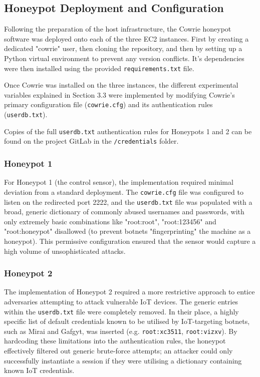\documentclass[]{article}
\begin{document}
\subsection{Honeypot Deployment and Configuration}

Following the preparation of the host infrastructure, the Cowrie honeypot software was deployed onto each of the three EC2 instances. First by creating a dedicated "cowrie" user, then cloning the repository, and then by setting up a Python virtual environment to prevent any version conflicts. It's dependencies were then installed using the provided \texttt{requirements.txt} file.

Once Cowrie was installed on the three instances, the different experimental variables explained in Section 3.3 were implemented by modifying Cowrie's primary configuration file (\texttt{cowrie.cfg}) and its authentication rules (\texttt{userdb.txt}).

Copies of the full \texttt{userdb.txt} authentication rules for Honeypots 1 and 2 can be found on the project GitLab in the \texttt{/credentials} folder.

\subsubsection{Honeypot 1}

For Honeypot 1 (the control sensor), the implementation required minimal deviation from  a standard deployment. The \texttt{cowrie.cfg} file was configured to listen on the redirected port 2222, and the \texttt{userdb.txt} file was populated with a broad, generic dictionary of commonly abused usernames and passwords, with only extremely basic combinations like "root:root", "root:123456" and "root:honeypot" disallowed (to prevent botnets "fingerprinting" the machine as a honeypot). This permissive configuration ensured that the sensor would capture a high volume of unsophisticated attacks.

\subsubsection{Honeypot 2}

The implementation of Honeypot 2 required a more restrictive approach to entice adversaries attempting to attack vulnerable IoT devices. The generic entries within the \texttt{userdb.txt} file were completely removed. In their place, a highly specific list of default credentials known to be utilised by IoT-targeting botnets, such as Mirai and Gafgyt, was inserted (e.g. \texttt{root:xc3511}, \texttt{root:vizxv}). By hardcoding these limitations into the authentication rules, the honeypot effectively filtered out generic brute-force attempts; an attacker could only successfully instantiate a session if they were utilising a dictionary containing known IoT credentials.
\end{document}
